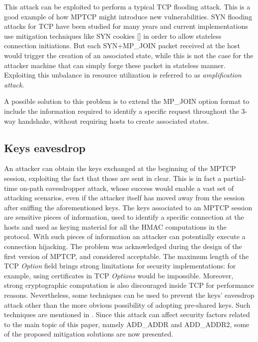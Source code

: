 This attack can be exploited to perform a typical TCP flooding attack. This is a good example of how MPTCP might introduce new vulnerabilities. 
SYN flooding attacks for TCP have been studied for many years and current implementations use mitigation techniques like SYN cookies [] in order to allow stateless connection initiations. But each SYN+MP\_JOIN packet received at the host would trigger the creation of an associated state, while this is not the case for the attacker machine that can simply forge these packet in stateless manner. Exploiting this unbalance in resource utilization is referred to as \textit{amplification attack}.

A possible solution to this problem is to extend the MP\_JOIN option format to include the information required to identify a specific request throughout the 3-way handshake, without requiring hosts to create associated states.

\subsection{Keys eavesdrop}
\label{keyseav}
An attacker can obtain the keys exchanged at the beginning of the MPTCP session, exploiting the fact that those are sent in clear. This is in fact a partial-time on-path eavesdropper attack, whose success would enable a vast set of attacking scenarios, even if the attacker itself has moved away from the session after sniffing the aforementioned keys.
The keys associated to an MPTCP session are sensitive pieces of information, used to identify a specific connection at the hosts and used as keying material for all the HMAC computations in the protocol. With such pieces of information an attacker can potentially execute a connection hijacking.  The problem was acknowledged during the design of the first version of MPTCP, and considered acceptable. The maximum length of the TCP \textit{Option} field brings strong limitations for security implementations: for example, using certificates in TCP \textit{Options} would be impossible. Moreover, strong cryptographic computation is also discouraged inside TCP for performance reasons. Nevertheless, some techniques can be used to prevent the keys' eavesdrop attack other than the more obvious possibility of adopting pre-shared keys. Such techniques are mentioned in . Since this attack can affect security factors related to the main topic of this paper, namely ADD\_ADDR and ADD\_ADDR2, some of the proposed mitigation solutions are now presented.

